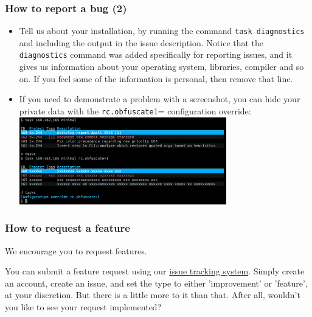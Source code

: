 \documentclass[t,handout]{beamer}
\begin{document}
\begin{frame}[fragile]\frametitle{How to report a bug (2)}
    \begin{itemize}
        \item Tell us about your installation, by running the command \verb=task diagnostics= and including the output in the issue description. Notice that the \verb=diagnostics= command was added specifically for reporting issues, and it gives us information about your operating system, libraries, compiler and so on. If you feel some of the information is personal, then remove that line.
        \item If you need to demonstrate a problem with a screenshot, you can hide your private data with the \verb=rc.obfuscate=1= configuration override:
        \includegraphics[width=9cm]{obfuscate.png}
    \end{itemize}
\end{frame}

\begin{frame}[fragile]\frametitle{How to request a feature}
    \vfill
    We encourage you to request features.

    You can submit a feature request using our \href{https://bug.tasktools.org}{issue tracking system}. Simply create an account, create an issue, and set the type to either 'improvement' or 'feature', at your discretion. But there is a little more to it than that. After all, wouldn't you like to see your request implemented?
\end{frame}
\end{document}
